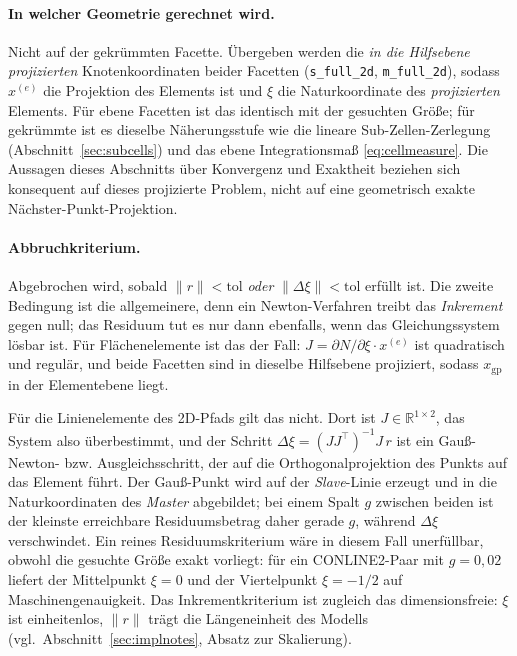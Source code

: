 \documentclass[a4paper,11pt]{article}
\def\bm#1{#1}%
\def\tfrac#1#2{#1/#2}%
\newcommand{\code}[1]{\texttt{\small #1}}
\begin{document}
\paragraph{In welcher Geometrie gerechnet wird.} Nicht auf der gekrümmten Facette. Übergeben werden
die \emph{in die Hilfsebene projizierten} Knotenkoordinaten beider Facetten
(\code{s\_full\_2d}, \code{m\_full\_2d}), sodass $\bm x^{(e)}$ die Projektion des Elements ist und
$\bm\xi$ die Naturkoordinate des \emph{projizierten} Elements. Für ebene Facetten ist das
identisch mit der gesuchten Größe; für gekrümmte ist es dieselbe Näherungsstufe wie die lineare
Sub-Zellen-Zerlegung (Abschnitt~\ref{sec:subcells}) und das ebene Integrationsmaß
\eqref{eq:cellmeasure}. Die Aussagen dieses Abschnitts über Konvergenz und Exaktheit beziehen sich
konsequent auf dieses projizierte Problem, nicht auf eine geometrisch exakte
Nächster-Punkt-Projektion.

\paragraph{Abbruchkriterium.}
Abgebrochen wird, sobald $\|\bm r\|<\text{tol}$ \emph{oder} $\|\Delta\bm\xi\|<\text{tol}$ erfüllt
ist. Die zweite Bedingung ist die allgemeinere, denn ein Newton-Verfahren treibt das
\emph{Inkrement} gegen null; das Residuum tut es nur dann ebenfalls, wenn das Gleichungssystem
lösbar ist. Für Flächenelemente ist das der Fall: $\bm J=\partial\bm N/\partial\bm\xi\cdot\bm x^{(e)}$
ist quadratisch und regulär, und beide Facetten sind in dieselbe Hilfsebene projiziert, sodass
$\bm x_{\text{gp}}$ in der Elementebene liegt.

Für die Linienelemente des 2D-Pfads gilt das nicht. Dort ist $\bm J\in\mathbb R^{1\times2}$, das
System also überbestimmt, und der Schritt
$\Delta\xi=(\bm J\bm J^{\!\top})^{-1}\bm J\,\bm r$ ist ein Gauß-Newton- bzw.
Ausgleichsschritt, der auf die Orthogonalprojektion des Punkts auf das Element führt. Der
Gauß-Punkt wird auf der \emph{Slave}-Linie erzeugt und in die Naturkoordinaten des \emph{Master}
abgebildet; bei einem Spalt $g$ zwischen beiden ist der kleinste erreichbare Residuumsbetrag daher
gerade $g$, während $\Delta\xi$ verschwindet. Ein reines Residuumskriterium wäre in diesem Fall
unerfüllbar, obwohl die gesuchte Größe exakt vorliegt: für ein CONLINE2-Paar mit $g=0{,}02$ liefert
der Mittelpunkt $\xi=0$ und der Viertelpunkt $\xi=-\tfrac12$ auf Maschinengenauigkeit. Das
Inkrementkriterium ist zugleich das dimensionsfreie: $\bm\xi$ ist einheitenlos, $\|\bm r\|$ trägt
die Längeneinheit des Modells (vgl.\ Abschnitt~\ref{sec:implnotes}, Absatz zur Skalierung).
\end{document}
